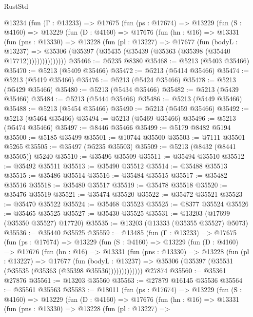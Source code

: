 \begin{lexlean}{RustStd}
\begin{coremodule}
    @13234
      (fun (Γ : @13233) =>
      @17675
        (fun (ps : @17674) =>
        @13229
          (fun (S : @4160) =>
          @13229
            (fun (D : @4160) =>
            @17676
              (fun (hn : @16) =>
              @13331
                (fun (pns : @13330) =>
                @13228
                  (fun (pl : @13227) =>
                  @17677
                    (fun (bodyL : @13237) =>
                    @35306 (@35397 (@35435 (@35439 (@35363 (@35398 (@35440 @17712)))))))))))))))
@35466 := @5235 @8380
@35468 := @5213 (@5403 @35466)
@35470 := @5213 (@5409 @35466)
@35472 := @5213 (@5414 @35466)
@35474 := @5213 (@5419 @35466)
@35476 := @5213 (@5424 @35466)
@35478 := @5213 (@5429 @35466)
@35480 := @5213 (@5434 @35466)
@35482 := @5213 (@5439 @35466)
@35484 := @5213 (@5444 @35466)
@35486 := @5213 (@5449 @35466)
@35488 := @5213 (@5454 @35466)
@35490 := @5213 (@5459 @35466)
@35492 := @5213 (@5464 @35466)
@35494 := @5213 (@5469 @35466)
@35496 := @5213 (@5474 @35466)
@35497 := @8446 @35466
@35499 := @5179 @8482 @5194
@35500 := @5185 @35499
@35501 := @10744 @35500
@35503 := @7111 @35501 @5265
@35505 := @35497 (@5235 @35503)
@35509 := @5213 (@8432 (@8441 @35505)) @5240
@35510 := @35496 @35509
@35511 := @35494 @35510
@35512 := @35492 @35511
@35513 := @35490 @35512
@35514 := @35488 @35513
@35515 := @35486 @35514
@35516 := @35484 @35515
@35517 := @35482 @35516
@35518 := @35480 @35517
@35519 := @35478 @35518
@35520 := @35476 @35519
@35521 := @35474 @35520
@35522 := @35472 @35521
@35523 := @35470 @35522
@35524 := @35468 @35523
@35525 := @8377 @35524
@35526 := @35465 @35525
@35527 := @35430 @35525
@35531 := @13203 (@17699 (@35350 @35527) @17720)
@35535 := @13203 (@13333 (@35355 @35527) @5073)
@35536 := @35440 @35525
@35559 := @13485
    (fun (Γ : @13233) =>
    @17675
      (fun (ps : @17674) =>
      @13229
        (fun (S : @4160) =>
        @13229
          (fun (D : @4160) =>
          @17676
            (fun (hn : @16) =>
            @13331
              (fun (pns : @13330) =>
              @13228
                (fun (pl : @13227) =>
                @17677
                  (fun (bodyL : @13237) =>
                  @35306 (@35397 (@35531 (@35535 (@35363 (@35398 @35536)))))))))))))
    @27874
@35560 := @35361 @27876
@35561 := @13203 @35560
@35563 := @27879 @16145 @35536
@35564 := @35561 @35563
@35583 := @18011
    (fun (ps : @17674) =>
    @13229
      (fun (S : @4160) =>
      @13229
        (fun (D : @4160) =>
        @17676
          (fun (hn : @16) =>
          @13331
            (fun (pns : @13330) =>
            @13228
              (fun (pl : @13227) =>

\end{coremodule}
\end{lexlean}
